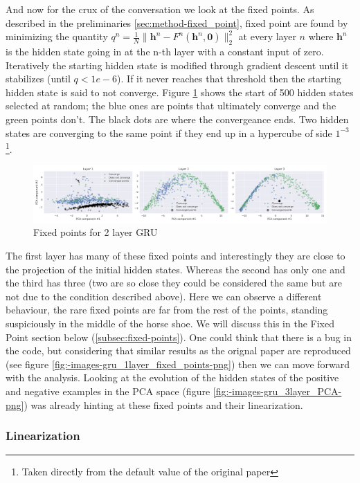 \documentclass{article}
\begin{document}
And now for the crux of the conversation we look at the fixed points. As described in the preliminaries \ref{sec:method-fixed_point}, fixed point are found by minimizing the quantity $q^{n}=\frac{1}{N}\|\textbf{h}^{n}-F^{n}(\textbf{h}^{n}, \textbf{0})\|_2^2$ at every layer $n$ where  $\textbf{h}^n$ is the hidden state going in at the n-th layer with a constant input of zero. Iteratively the starting hidden state is modified through gradient descent until it stabilizes (until $q < 1e-6$). If it never reaches that threshold then the starting hidden state is said to not converge. Figure \ref{fig:-images-gru_3layer_fixed_points-png} shows the start of 500 hidden states selected at random; the blue ones are points that ultimately converge and the green points don't. The black dots are where the convergeance ends. Two hidden states are converging to the same point if they end up in a hypercube of side $1^{-3}$ \footnote{Taken directly from the default value of the original paper}.
\begin{figure}[H]
  \centering
  \includegraphics[width=1\textwidth]{../images/gru_3layer_fixed_points.png}
  \caption{Fixed points for 2 layer GRU}
  \label{fig:-images-gru_3layer_fixed_points-png}
\end{figure}
The first layer has many of these fixed points and interestingly they are close to the projection of the initial hidden states. Whereas the second has only one and the third has three (two are so close they could be considered the same but are not due to the condition described above). Here we can observe a different behaviour, the rare fixed points are far from the rest of the points, standing suspiciously in the middle of the horse shoe. We will discuss this in the Fixed Point section below (\ref{subsec:fixed-points}). One could think that there is a bug in the code, but considering that similar results as the orignal paper are reproduced (see figure \ref{fig:-images-gru_1layer_fixed_points-png}) then we can move forward with the analysis. Looking at the evolution of the hidden states of the positive and negative examples in the PCA space (figure \ref{fig:-images-gru_3layer_PCA-png}) was already hinting at these fixed points and their linearization.
\subsubsection{Linearization}
\end{document}
